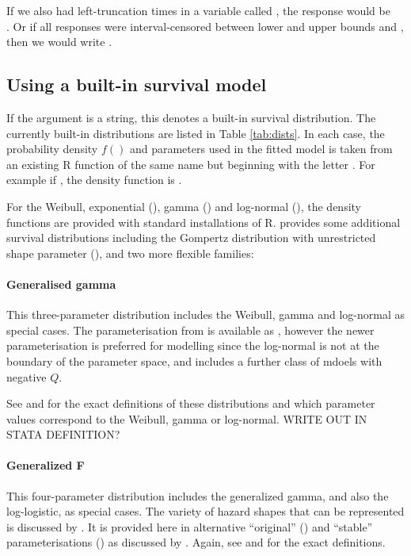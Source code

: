 \documentclass[nojss,nofooter]{jss}\usepackage[]{graphicx}\usepackage[]{color}
\begin{document}
If we also had left-truncation times in a variable called
, the response would be \\ .
Or if all responses were interval-censored between lower and upper
bounds  and , then we would write
.


\subsection{Using a built-in survival model}

If the argument  is a string, this denotes a built-in
survival distribution.  The currently built-in distributions are
listed in Table \ref{tab:dists}.  In each case, the probability
density $f()$ and parameters used in the fitted model is taken from an
existing R function of the same name but beginning with the letter
.  For example if , the density function
is .

For the Weibull, exponential (), gamma () and
log-normal (), the density functions are provided with
standard installations of R.   provides some additional
survival distributions including the Gompertz distribution with
unrestricted shape parameter (), and two more
flexible families:

\paragraph{Generalised gamma} This three-parameter distribution
includes the Weibull, gamma and log-normal as special cases.  The
parameterisation from \citet{stacy:gengamma} is available as
, however the newer parameterisation
\citet{prentice:loggamma} is preferred for modelling since the
log-normal is not at the boundary of the parameter space, and includes
a further class of mdoels with negative $Q$.

See  and  for the exact
definitions of these distributions and which parameter values
correspond to the Weibull, gamma or log-normal. WRITE OUT IN STATA
DEFINITION?

\paragraph{Generalized F} This four-parameter distribution includes
the generalized gamma, and also the log-logistic, as special cases.
The variety of hazard shapes that can be represented is discussed by
\citet{ccox:genf}.  It is provided here in alternative ``original''
() and ``stable'' parameterisations
() as discussed by \citet{prentice:genf}.  Again,
see  and  for the exact
definitions.
\end{document}

